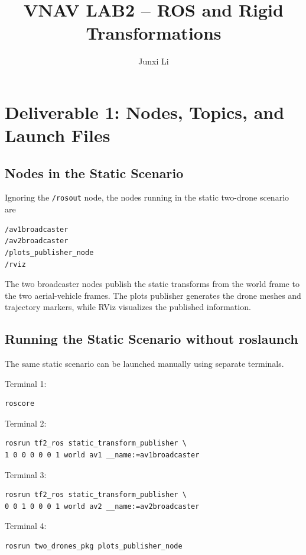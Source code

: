 \documentclass[11pt,a4paper]{article}
\title{VNAV LAB2 -- ROS and Rigid Transformations}
\author{Junxi Li}
\date{}
\begin{document}
\maketitle

\section{Deliverable 1: Nodes, Topics, and Launch Files}

\subsection{Nodes in the Static Scenario}

Ignoring the \texttt{/rosout} node, the nodes running in the static
two-drone scenario are

\begin{verbatim}
/av1broadcaster
/av2broadcaster
/plots_publisher_node
/rviz
\end{verbatim}

The two broadcaster nodes publish the static transforms from the world
frame to the two aerial-vehicle frames. The plots publisher generates
the drone meshes and trajectory markers, while RViz visualizes the
published information.

\subsection{Running the Static Scenario without roslaunch}

The same static scenario can be launched manually using separate
terminals.

Terminal 1:
\begin{verbatim}
roscore
\end{verbatim}

Terminal 2:
\begin{verbatim}
rosrun tf2_ros static_transform_publisher \
1 0 0 0 0 0 1 world av1 __name:=av1broadcaster
\end{verbatim}

Terminal 3:
\begin{verbatim}
rosrun tf2_ros static_transform_publisher \
0 0 1 0 0 0 1 world av2 __name:=av2broadcaster
\end{verbatim}

Terminal 4:
\begin{verbatim}
rosrun two_drones_pkg plots_publisher_node
\end{verbatim}
\end{document}
